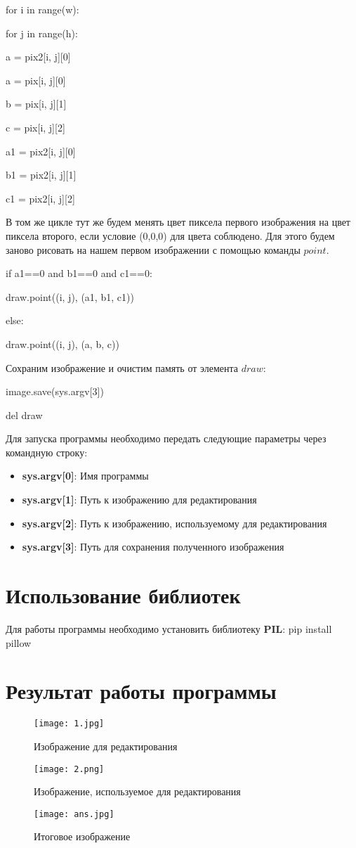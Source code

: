 \documentclass{article}
\newcommand\tab[1][1cm]{\hspace*{#1}}
\begin{document}
{

for i in range(w):

\tab[0.5cm] for j in range(h):

\tab[1cm] a = pix2[i, j][0]

\tab[1cm] a = pix[i, j][0]

\tab[1cm] b = pix[i, j][1]

\tab[1cm] c = pix[i, j][2]

\tab[1cm] a1 = pix2[i, j][0]

\tab[1cm] b1 = pix2[i, j][1]

\tab[1cm] c1 = pix2[i, j][2] }

В том же цикле тут же будем менять цвет пиксела первого изображения на цвет пиксела второго, если условие (0,0,0) для цвета соблюдено. Для этого будем заново рисовать на нашем первом изображении с помощью команды $point$.

{
if a1==0 and b1==0 and c1==0:

\tab[0.5cm] draw.point((i, j), (a1, b1, c1))

else:

\tab[0.5cm] draw.point((i, j), (a, b, c))}


Сохраним изображение и очистим память от элемента $draw$:

{
image.save(sys.argv[3])

del draw
}



Для запуска программы необходимо передать следующие параметры через командную строку:
\begin{itemize}
    \item \textbf{sys.argv[0]}: Имя программы
    \item \textbf{sys.argv[1]}: Путь к изображению для редактирования
    \item \textbf{sys.argv[2]}: Путь к изображению, используемому для редактирования
    \item \textbf{sys.argv[3]}: Путь для сохранения полученного изображения
\end{itemize}

\section{Использование библиотек}

Для работы программы необходимо установить библиотеку \textbf{PIL}:
pip install pillow
\newpage
\section{Результат работы программы}

\begin{figure}[h]
    \centering
    \texttt{[image: 1.jpg]}
    \caption{Изображение для редактирования}


    \texttt{[image: 2.png]}
    \caption{Изображение, используемое для редактирования}
    \texttt{[image: ans.jpg]}
    \caption{Итоговое изображение}

\end{figure}
\end{document}
